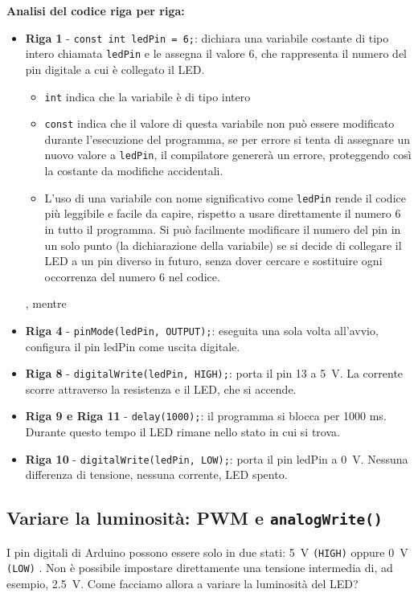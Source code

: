 \textbf{Analisi del codice riga per riga:}
\begin{itemize}
    \item \textbf{Riga 1} - \texttt{const int ledPin = 6;}: dichiara una variabile costante di tipo intero chiamata \texttt{ledPin} e le assegna il valore 6, che rappresenta il numero del pin digitale a cui è collegato il LED.
    \begin{itemize}
        \item \texttt{int} indica che la variabile è di tipo intero
        \item \texttt{const} indica che il valore di questa variabile non può essere modificato durante l'esecuzione del programma, se per errore si tenta di assegnare un nuovo valore a \texttt{ledPin}, il compilatore genererà un errore, proteggendo così la costante da modifiche accidentali.
        \item L'uso di una variabile con nome significativo come \texttt{ledPin} rende il codice più leggibile e facile da capire, rispetto a usare direttamente il numero 6 in tutto il programma. Si può facilmente modificare il numero del pin in un solo punto (la dichiarazione della variabile) se si decide di collegare il LED a un pin diverso in futuro, senza dover cercare e sostituire ogni occorrenza del numero 6 nel codice.
    \end{itemize}
    , mentre 
    \item \textbf{Riga 4} - \texttt{pinMode(ledPin, OUTPUT);}: eseguita una sola volta all'avvio, configura il pin ledPin come uscita digitale.
    \item \textbf{Riga 8} - \texttt{digitalWrite(ledPin, HIGH);}: porta il pin 13 a \SI{5}{\volt}. La corrente scorre attraverso la resistenza e il LED, che si accende.
    \item \textbf{Riga 9 e Riga 11} - \texttt{delay(1000);}: il programma si blocca per 1000 ms. Durante questo tempo il LED rimane nello stato in cui si trova.
    \item \textbf{Riga 10} - \texttt{digitalWrite(ledPin, LOW);}: porta il pin ledPin a \SI{0}{\volt}. Nessuna differenza di tensione, nessuna corrente, LED spento.
\end{itemize}

\subsection{Variare la luminosità: PWM e \texttt{analogWrite()}}

I pin digitali di Arduino possono essere solo in due stati: \SI{5}{\volt} \texttt{(HIGH)} oppure \SI{0}{\volt} \texttt{(LOW)} . Non è possibile impostare direttamente una tensione intermedia di, ad esempio, \SI{2.5}{\volt}. Come facciamo allora a variare la luminosità del LED?\\


